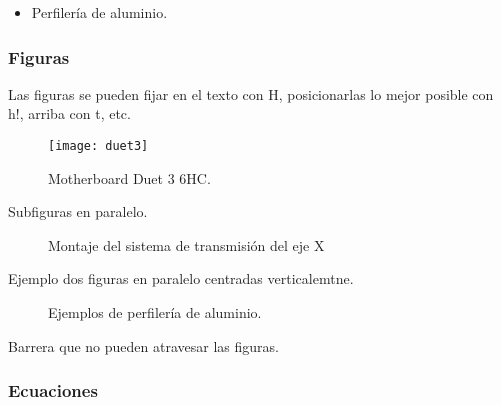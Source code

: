 \begin{itemize}[label={\scriptsize\raisebox{0.5ex}{\textbullet}}]

	\item Perfilería de aluminio.

\end{itemize}




\subsubsection{Figuras}

Las figuras se pueden fijar en el texto con H, posicionarlas lo mejor posible con h!, arriba con t, etc.

\begin{figure}[H]
	\centering
	\texttt{[image: duet3]}
	\caption{Motherboard Duet 3 6HC.}
	\label{fig:000_00}
\end{figure}

Subfiguras en paralelo.

\begin{figure}[H]
	\centering
	\hspace*{10mm}
	\caption{Montaje del sistema de transmisión del eje X}
	\label{fig:mont_nema}
\end{figure}


Ejemplo dos figuras en paralelo centradas verticalemtne.

\begin{figure}[H]
	\begin{minipage}{\textwidth}
		\centering
	\hspace*{.2in}
	\end{minipage}
	\caption{Ejemplos de perfilería de aluminio.}
	\label{fig:perfileria_alumnio}
\end{figure}

Barrera que no pueden atravesar las figuras.
\FloatBarrier



\subsubsection{Ecuaciones}

